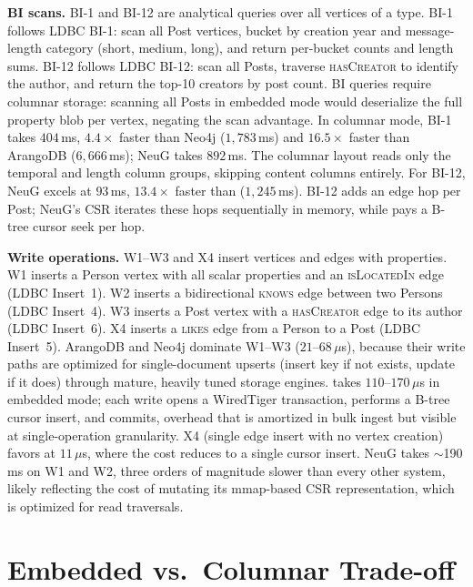 \textbf{BI scans.}
BI-1 and BI-12 are analytical queries over all vertices of a
type.
BI-1 follows LDBC BI-1: scan all Post vertices, bucket by creation year and
message-length category (short, medium, long), and return per-bucket counts and
length sums.
BI-12 follows LDBC BI-12: scan all Posts, traverse \textsc{hasCreator} to
identify the author, and return the top-10 creators by post count.
%
BI queries require columnar storage: scanning all Posts in embedded mode would deserialize the full property blob per vertex, negating the scan advantage.
In columnar mode, BI-1 takes $404$\,ms, $4.4\times$ faster than Neo4j ($1{,}783$\,ms) and $16.5\times$ faster than ArangoDB ($6{,}666$\,ms); NeuG takes $892$\,ms.
The columnar layout reads only the temporal and length column groups, skipping content columns entirely.
For BI-12, NeuG excels at $93$\,ms, $13.4\times$ faster than \project{} ($1{,}245$\,ms).
BI-12 adds an edge hop per Post; NeuG's CSR iterates these hops sequentially in memory, while \project{} pays a B-tree cursor seek per hop.

\textbf{Write operations.}
W1--W3 and X4 insert vertices and edges with properties.
W1 inserts a Person vertex with all scalar properties and an
\textsc{isLocatedIn} edge (LDBC Insert~1).
W2 inserts a bidirectional \textsc{knows} edge between two Persons (LDBC
Insert~4).
W3 inserts a Post vertex with a \textsc{hasCreator} edge to its author (LDBC
Insert~6).
X4 inserts a \textsc{likes} edge from a Person to a Post (LDBC Insert~5).
%
ArangoDB and Neo4j dominate W1--W3 ($21$--$68$\,$\mu$s), because their write paths are optimized for single-document upserts (insert key if not exists, update if it does) through mature, heavily tuned storage engines.
\project{} takes $110$--$170$\,$\mu$s in embedded mode; each write opens a WiredTiger transaction, performs a B-tree cursor insert, and commits, overhead that is amortized in bulk ingest but visible at single-operation granularity.
X4 (single edge insert with no vertex creation) favors \project{} at $11$\,$\mu$s, where the cost reduces to a single cursor insert.
NeuG takes ${\sim}$190\,ms on W1 and W2, three orders of magnitude slower than every other system, likely reflecting the cost of mutating its mmap-based CSR representation, which is optimized for read traversals.

\section{Embedded vs.\ Columnar Trade-off}
\label{sec:eval:emb-vs-col}


